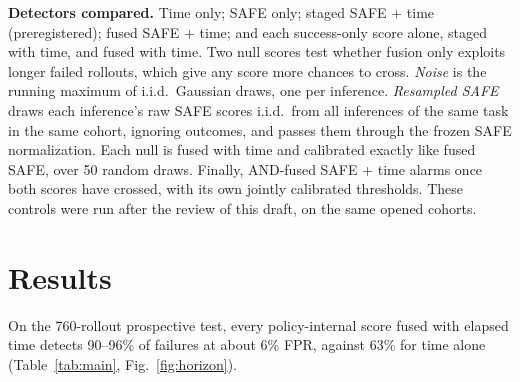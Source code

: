 \documentclass[conference,a4paper]{IEEEtran}
\begin{document}
\textbf{Detectors compared.} Time only; SAFE only; staged SAFE + time (preregistered); fused
SAFE + time; and each success-only score alone, staged with time, and fused with time.
Two null scores test whether fusion only exploits longer failed rollouts, which give any
score more chances to cross. \emph{Noise} is the running maximum of i.i.d.\ Gaussian draws,
one per inference. \emph{Resampled SAFE} draws each inference's raw SAFE scores i.i.d.\ from
all inferences of the same task in the same cohort, ignoring outcomes, and passes them
through the frozen SAFE normalization. Each null is fused with time and calibrated exactly
like fused SAFE, over 50 random draws. Finally, AND-fused SAFE + time alarms once both
scores have crossed, with its own jointly calibrated thresholds. These controls were run
after the review of this draft, on the same opened cohorts.

\section{Results}

On the 760-rollout prospective test, every policy-internal score fused with elapsed time
detects 90--96\% of failures at about 6\% FPR, against 63\% for time alone
(Table~\ref{tab:main}, Fig.~\ref{fig:horizon}).
\end{document}
